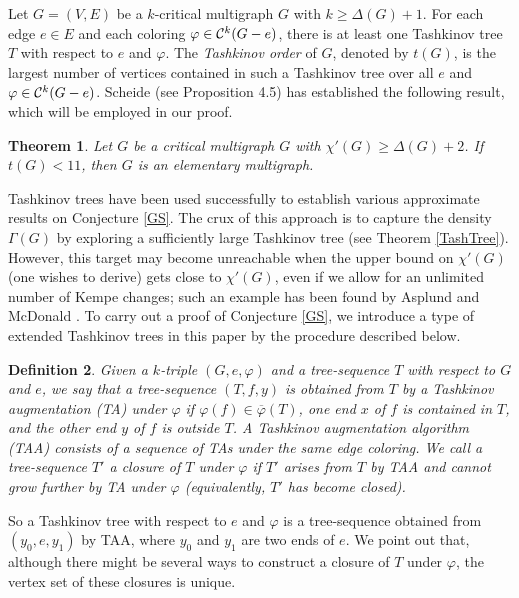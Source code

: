 \documentclass[11pt]{article}
\newtheorem{theorem}{Theorem}[section]
\newtheorem{definition}[theorem]{Definition}
\newcommand{\phibar}{\overline{\varphi}}
\begin{document}
Let $G=(V,E)$ be a $k$-critical multigraph $G$ with $k \ge \Delta(G)+1$. For each edge $e\in E$ and each 
coloring $\varphi \in {\cal C}^k(G-e)$, there is at least one Tashkinov tree $T$ with respect to $e$ and $\varphi$. 
The {\em Tashkinov order}\label{torder} of $G$, denoted by $t(G)$, is the largest number of vertices contained in 
such a Tashkinov tree over all $e$ and $\varphi \in {\cal C}^k(G-e)$.  Scheide \cite{S} (see Proposition 4.5) 
has established the following result, which will be employed in our proof.

\begin{theorem} \label{ThmScheide}
Let $G$ be a critical multigraph $G$ with $\chi'(G) \ge \Delta(G)+2$. If $t(G)<11$, then $G$ is an elementary
multigraph. 
\end{theorem}

Tashkinov trees have been used successfully to establish various approximate results on Conjecture \ref{GS}. 
The crux of this approach is to capture the density $\Gamma(G)$ by exploring a sufficiently large Tashkinov tree 
(see Theorem \ref{TashTree}). However, this target may become unreachable when the upper bound on $\chi'(G)$
(one wishes to derive) gets close to $\chi'(G)$, even if we allow for an unlimited number of Kempe changes; such 
an example has been found by Asplund and McDonald \cite{AM}. To carry out a proof of Conjecture \ref{GS}, we 
introduce a type of extended Tashkinov trees in this paper by  the procedure described below. 


\begin{definition} \label{TAA}
{\rm Given a $k$-triple $(G,e, \varphi)$ and a tree-sequence $T$ with respect to $G$ and $e$, we say that a tree-sequence $(T,f,y)$ is obtained from $T$
by a {\em Tashkinov augmentation}\label{TA} (TA) under $\varphi$ if $\varphi(f)\in\phibar(T)$, one end $x$ of $f$ is contained in $T$, and 
the other end $y$ of $f$ is outside $T$. A {\em Tashkinov augmentation algorithm} (TAA)\label{TAAalgorithm} consists of a sequence of TAs under the same
edge coloring. We call a tree-sequence $T'$ a {\em closure}\label{closure} of $T$ under $\varphi$ if $T'$ arises from $T$ by 
TAA and cannot grow further by TA under $\varphi$ (equivalently, $T'$ has become closed).} 
\end{definition}

So a Tashkinov tree with respect to $e$ and $\varphi$ is a tree-sequence obtained from $(y_0,e,y_1)$ by TAA, where
$y_0$ and $y_1$ are two ends of $e$. We point out that, although there might be several ways to construct a closure of $T$ under $\varphi$, the 
vertex set of these closures is unique.   
 
\end{document}
